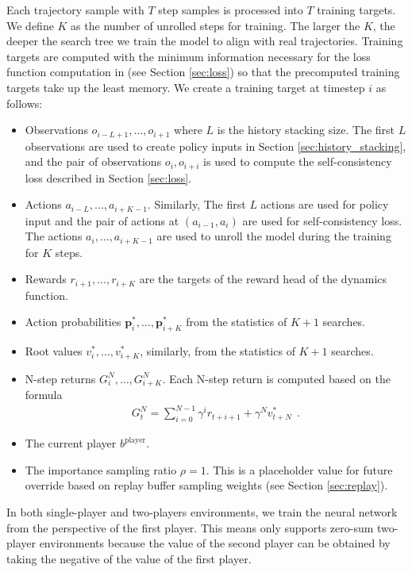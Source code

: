 Each trajectory sample with $T$ step samples is processed into $T$ training targets.
We define $K$ as the number of unrolled steps for training.
The larger the $K$, the deeper the search tree we train the model to align with real trajectories.
Training targets are computed with the minimum information necessary for the loss function computation in (see Section \ref{sec:loss}) so that the precomputed training targets take up the least memory.
We create a training target at timestep $i$ as follows:
\begin{itemize}
    \item Observations $o_{i - L + 1}, \dots, o_{i + 1}$ where $L$ is the history stacking size.
          The first $L$ observations are used to create policy inputs in Section \ref{sec:history_stacking},
          and the pair of observations $o_{i}, o_{i+i}$ is used to compute the self-consistency loss described in Section \ref{sec:loss}.

    \item Actions $a_{i - L}, \dots, a_{i + K - 1}$.
          Similarly, The first $L$ actions are used for policy input and the pair of actions at $(a_{i - 1}, a_{i})$ are used for self-consistency loss.
          The actions $a_{i}, \dots, a_{i + K - 1}$ are used to unroll the model during the training for $K$ steps.

    \item Rewards $r_{i + 1}, \dots, r_{i + K}$ are the targets of the reward head of the dynamics function.

    \item Action probabilities $\mathbf{p}^*_{i}, \dots, \mathbf{p}^*_{i + K}$ from the statistics of $K + 1$ searches.

    \item Root values $v^*_i, \dots, v^*_{i + K}$, similarly, from the statistics of $K + 1$ searches.

    \item N-step returns $G^N_{i}, \dots, G^N_{i + K}$.
          Each N-step return is computed based on the formula
          \begin{align*}
              G^N_{t} = \sum_{i = 0}^{N - 1}{\gamma^i r_{t+i+1}} + \gamma^Nv^*_{t + N} ~~ .
          \end{align*}

    \item The current player $b^{\text{player}}$.

    \item The importance sampling ratio $\rho = 1$. This is a placeholder value for future override based on replay buffer sampling weights (see Section \ref{sec:replay}).
\end{itemize}
In both single-player and two-players environments, we train the neural network from the perspective of the first player.
This means \moozi only supports zero-sum two-player environments because the value of the second player can be obtained by taking the negative of the value of the first player.

